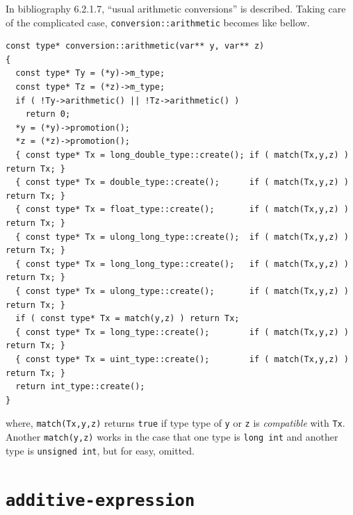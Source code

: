 In bibliography \cite{ISO} 6.2.1.7, ``usual arithmetic conversions''
is described. Taking care of the complicated case,
{\tt{conversion::arithmetic}} becomes like bellow.
\begin{verbatim}
const type* conversion::arithmetic(var** y, var** z)
{
  const type* Ty = (*y)->m_type;
  const type* Tz = (*z)->m_type;
  if ( !Ty->arithmetic() || !Tz->arithmetic() )
    return 0;
  *y = (*y)->promotion();
  *z = (*z)->promotion();
  { const type* Tx = long_double_type::create(); if ( match(Tx,y,z) ) return Tx; }
  { const type* Tx = double_type::create();      if ( match(Tx,y,z) ) return Tx; }
  { const type* Tx = float_type::create();       if ( match(Tx,y,z) ) return Tx; }
  { const type* Tx = ulong_long_type::create();  if ( match(Tx,y,z) ) return Tx; }
  { const type* Tx = long_long_type::create();   if ( match(Tx,y,z) ) return Tx; }
  { const type* Tx = ulong_type::create();       if ( match(Tx,y,z) ) return Tx; }
  if ( const type* Tx = match(y,z) ) return Tx;
  { const type* Tx = long_type::create();        if ( match(Tx,y,z) ) return Tx; }
  { const type* Tx = uint_type::create();        if ( match(Tx,y,z) ) return Tx; }
  return int_type::create();
}
\end{verbatim}
where, {\tt{match(Tx,y,z)}} returns {\tt{true}} if type type of
{\tt{y}} or {\tt{z}} is {\it compatible} with {\tt{Tx}}.
Another {\tt{match(y,z)}} works in the case
that one type is {\tt{long int}} and another type is {\tt{unsigned int}},
but for easy, omitted.

\section{\tt{additive-expression}}

